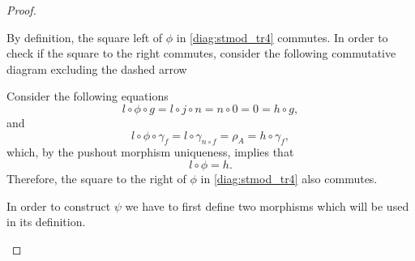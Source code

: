 \begin{proof}
\begin{enumerate}[label={(\bfseries TR\arabic*)}]
{\begin{center}
            \end{center}
            By definition, the square left of \( \phi \) in \autoref{diag:stmod_tr4} commutes. In order to check if the square to the right commutes, consider the following commutative diagram excluding the dashed arrow
            \begin{center}
            \end{center}
            Consider the following equations
            \[
                l \circ \phi \circ g = l \circ j \circ n = n \circ 0 = 0 = h \circ g,
            \]
            and
            \[
                l \circ \phi \circ \gamma_f = l \circ \gamma_{n \circ f} = \rho_A = h \circ \gamma_f,
            \]
            which, by the pushout morphism uniqueness, implies that
            \[
                l \circ \phi = h.
            \]
            Therefore, the square to the right of \( \phi \) in \autoref{diag:stmod_tr4} also commutes.

            In order to construct \( \psi \) we have to first define two morphisms which will be used in its definition.

}
\end{enumerate}
\end{proof}
